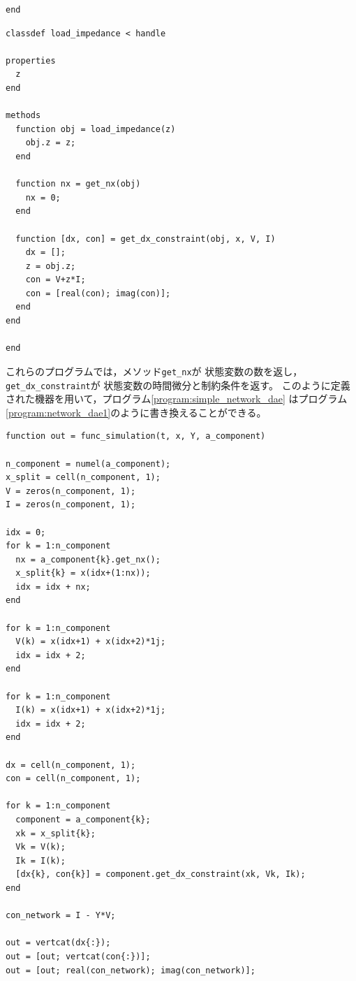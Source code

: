 \documentclass[tombow,dvipdfmx]{corona-a5-1.1}
\begin{document}
\begin{例}[発電機と負荷のモジュール化]
\begin{PROGRAMA}[count,title={generator.m}]
\begin{verbatim}
end
\end{verbatim}
\end{PROGRAMA}



\begin{PROGRAMA}[count,title={load\_impedance.m}]\label{program:load}
\begin{verbatim}
classdef load_impedance < handle
  
properties
  z
end

methods
  function obj = load_impedance(z)
    obj.z = z;
  end

  function nx = get_nx(obj)
    nx = 0;
  end

  function [dx, con] = get_dx_constraint(obj, x, V, I)
    dx = [];
    z = obj.z;
    con = V+z*I;
    con = [real(con); imag(con)];
  end
end

end
\end{verbatim}
\end{PROGRAMA}

これらのプログラムでは，メソッド\verb|get_nx|が
状態変数の数を返し，\verb|get_dx_constraint|が
状態変数の時間微分と制約条件を返す。
このように定義された機器を用いて，プログラム\nobreak\ref{program:simple_network_dae}
はプログラム\nobreak\ref{program:network_dae1}のように書き換えることができる。

\begin{PROGRAMA}[count,title={func\_simulation.m}]\label{program:network_dae1}
  \begin{verbatim}
function out = func_simulation(t, x, Y, a_component)

n_component = numel(a_component);
x_split = cell(n_component, 1);
V = zeros(n_component, 1);
I = zeros(n_component, 1);

idx = 0;
for k = 1:n_component
  nx = a_component{k}.get_nx();
  x_split{k} = x(idx+(1:nx));
  idx = idx + nx;
end

for k = 1:n_component
  V(k) = x(idx+1) + x(idx+2)*1j;
  idx = idx + 2;
end

for k = 1:n_component
  I(k) = x(idx+1) + x(idx+2)*1j;
  idx = idx + 2;
end

dx = cell(n_component, 1);
con = cell(n_component, 1);

for k = 1:n_component
  component = a_component{k};
  xk = x_split{k};
  Vk = V(k);
  Ik = I(k);
  [dx{k}, con{k}] = component.get_dx_constraint(xk, Vk, Ik);
end

con_network = I - Y*V;

out = vertcat(dx{:});
out = [out; vertcat(con{:})];
out = [out; real(con_network); imag(con_network)];


\end{verbatim}
\end{PROGRAMA}
\end{例}
\end{document}
